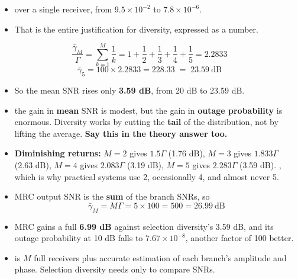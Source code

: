 \begin{itemize}
  \item {} over a single receiver, from $9.5\times10^{-2}$ to
        $7.8\times10^{-6}$.
  \item That is the entire justification for diversity, expressed as a number.
\end{itemize}

\[ \frac{\bar{\gamma}_M}{\Gamma} = \sum_{k=1}^{M}\frac{1}{k}
   = 1 + \frac{1}{2} + \frac{1}{3} + \frac{1}{4} + \frac{1}{5} = 2.2833 \]
\[ \bar{\gamma}_5 = 100 \times 2.2833 = 228.33 \;=\; \boxed{23.59\ \text{dB}} \]

\begin{itemize}
  \item So the mean SNR rises only \textbf{3.59 dB}, from 20 dB to 23.59 dB.
  \item {} the gain in \textbf{mean} SNR is modest, but the gain in
        \textbf{outage probability} is enormous. Diversity works by cutting the
        \textbf{tail} of the distribution, not by lifting the average.
        \textbf{Say this in the theory answer too.}
  \item \textbf{Diminishing returns:}
        $M{=}2$ gives $1.5\Gamma$ (1.76 dB),
        $M{=}3$ gives $1.833\Gamma$ (2.63 dB),
        $M{=}4$ gives $2.083\Gamma$ (3.19 dB),
        $M{=}5$ gives $2.283\Gamma$ (3.59 dB).
        , which is why practical systems
        use 2, occasionally 4, and almost never 5.
\end{itemize}

\begin{itemize}
  \item MRC output SNR is the \textbf{sum} of the branch SNRs, so
        \[ \bar{\gamma}_M = M\Gamma = 5 \times 100 = 500 = \boxed{26.99\ \text{dB}} \]
  \item MRC gains a full \textbf{6.99 dB} against selection diversity's 3.59 dB, and its outage
        probability at 10 dB falls to $7.67\times10^{-8}$, another factor of 100 better.
  \item {} is $M$ full receivers plus accurate estimation of each branch's amplitude
        and phase. Selection diversity needs only to compare SNRs.
\end{itemize}

